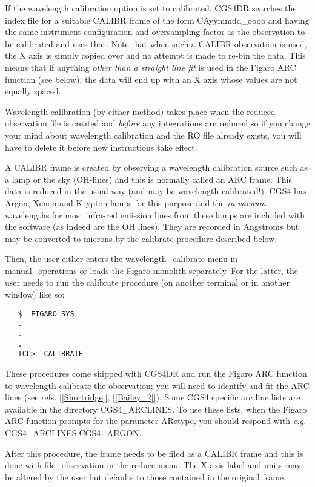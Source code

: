 {If the wavelength calibration option is set to {\sf calibrated}, CGS4DR 
searches the index file for a suitable {\sf CALIBR} frame of the form 
{\sf CAyymmdd\_oooo} and having the same instrument configuration and 
oversampling factor as the observation to be calibrated and uses that. 
Note that when such a {\sf CALIBR} observation is used, the X axis is 
simply copied over and no attempt is made to re-bin the data. This means that 
if anything {\em other than a straight line fit} is used in the Figaro ARC 
function (see below), the data will end up with an X axis whose values are 
not equally spaced. 

Wavelength calibration (by either method) takes place when the reduced 
observation file is created and {\em before} any integrations are reduced so
if you change your mind about wavelength calibration and the RO file already
exists, you will have to delete it before new instructions take effect.

A {\sf CALIBR} frame is created by observing a wavelength calibration
source such as a lamp or the sky (OH-lines) and this is normally called an 
{\sf ARC} frame. This data is reduced in the usual way (and may be wavelength 
calibrated!). CGS4 has Argon, Xenon and Krypton lamps for this purpose and the
{\em in-vacuum} wavelengths for most infra-red emission lines from these lamps 
are included with the software (as indeed are the OH lines). They are recorded 
in Angstroms but may be converted to microns by the calibrate procedure 
described below.

Then, the user either enters the {\sf wavelength\_calibrate} menu in 
{\sf manual\_operations} or loads the Figaro monolith separately. For
the latter, the user needs to run the calibrate procedure (on another 
terminal or in another window) like so:

\begin{verbatim}
   $  FIGARO_SYS
   .
   .
   .
   ICL>  CALIBRATE
\end{verbatim}

These procedures come shipped with CGS4DR and run the Figaro ARC function to
wavelength calibrate the observation; you will need to identify and fit the
ARC lines (see refs. [\ref{Shortridge}], [\ref{Bailey_2}]). Some CGS4 specific
arc line lists are available in the directory {\sf CGS4\_ARCLINES}. To use these
lists, when the Figaro ARC function prompts for the parameter {\sf ARctype},
you should respond with {\em e.g.} {\sf CGS4\_ARCLINES:CGS4\_ARGON}.

After this procedure, the frame needs to be filed as a {\sf CALIBR} frame
and this is done with {\sf file\_observation} in the {\sf reduce} menu.
The X axis label and units may be altered by the user but defaults to those 
contained in the original frame.

}
